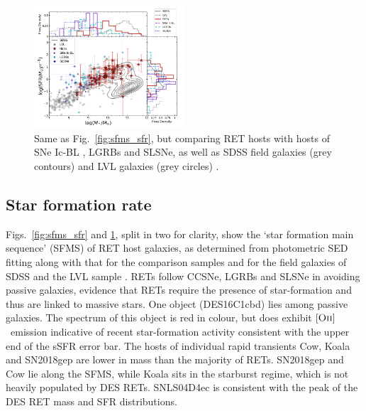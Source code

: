 \documentclass[fleqn,usenatbib,]{mnras}
\newcommand{\replyref}[1]{\color{magenta}#1 \color{black}}
\newcommand{\OII}[0]{$[\textnormal{\textsc{Oii}}]$}
\begin{document}
\begin{figure}
\includegraphics[width=0.5\textwidth]{figs/SFR_Mike_Other.png}
\caption{Same as Fig.~\ref{fig:sfms_sfr}, but comparing RET hosts with hosts of \replyref{SNe Ic-BL}, LGRBs and SLSNe, as well as SDSS field galaxies (grey contours) and \replyref{LVL galaxies (grey circles)}.
\label{fig:sfms_sfr_other}}
\end{figure}

\subsection{Star formation rate \label{subsec:res_sfr}}
Figs.~\ref{fig:sfms_sfr} and \ref{fig:sfms_sfr_other}, split in two for clarity, show the `star formation main sequence' (SFMS) of RET host galaxies, as determined from photometric SED fitting along with that for the comparison samples and for the field galaxies of SDSS \replyref{and the LVL sample}. RETs follow CCSNe, LGRBs and SLSNe in avoiding passive galaxies, evidence that RETs require the presence of star-formation and thus are linked to massive stars. One object (DES16C1cbd) lies among passive galaxies. The spectrum of this object is red in colour, but does exhibit \OII~emission indicative of recent star-formation activity consistent with the upper end of the sSFR error bar. The hosts of individual rapid transients Cow, Koala and SN2018gep are lower in mass than the majority of RETs. SN2018gep and Cow lie along the SFMS, while Koala sits in the starburst regime, which is not heavily populated by DES RETs. SNLS04D4ec is consistent with the peak of the DES RET mass and SFR distributions. 
\end{document}
